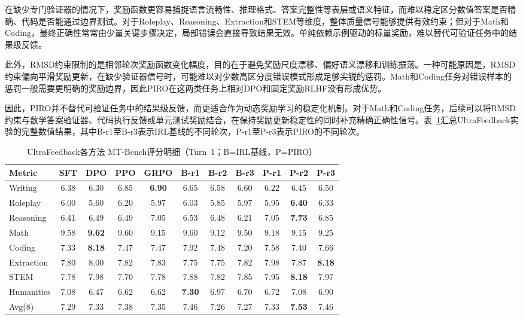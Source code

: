 在缺少专门验证器的情况下，奖励函数更容易捕捉语言流畅性、推理格式、答案完整性等表层或语义特征，而难以稳定区分数值答案是否精确、代码是否能通过边界测试。对于Roleplay、Reasoning、Extraction和STEM等维度，整体质量信号能够提供有效约束；但对于Math和Coding，最终正确性常常由少量关键步骤决定，局部错误会直接导致结果无效。单纯依赖示例驱动的标量奖励，难以替代可验证任务中的结果级反馈。

此外，RMSD约束限制的是相邻轮次奖励函数变化幅度，目的在于避免奖励尺度漂移、偏好语义漂移和训练振荡。一种可能原因是，RMSD约束偏向平滑奖励更新，在缺少验证器信号时，可能难以对少数高区分度错误模式形成足够尖锐的惩罚。Math和Coding任务对错误样本的惩罚一般需要更明确的奖励边界，因此PIRO在这两类任务上相对DPO和固定奖励RLHF没有形成优势。

因此，PIRO并不替代可验证任务中的结果级反馈，而更适合作为动态奖励学习的稳定化机制。对于Math和Coding任务，后续可以将RMSD约束与数学答案验证器、代码执行反馈或单元测试奖励结合，在保持奖励更新稳定性的同时补充精确正确性信号。表~\ref{tab:uf_detail}汇总UltraFeedback实验的完整数值结果，其中B-r1至B-r3表示IRL基线的不同轮次，P-r1至P-r3表示PIRO的不同轮次。

\begin{table}[H]
    \centering
    \caption{UltraFeedback各方法 MT-Bench评分明细（Turn~1；B=IRL基线，P=PIRO）}
    \label{tab:uf_detail}
    \scriptsize
    \renewcommand{\arraystretch}{1.12}
    \setlength{\tabcolsep}{4pt}
    \begin{tabular}{lcccccccccc}
        \toprule
        \textbf{Metric} & \textbf{SFT} & \textbf{DPO} & \textbf{PPO} & \textbf{GRPO} & \textbf{B-r1} & \textbf{B-r2} & \textbf{B-r3} & \textbf{P-r1} & \textbf{P-r2} & \textbf{P-r3} \\
        \midrule
        Writing    & 6.38 & 6.30 & 6.85 & \textbf{6.90} & 6.65 & 6.58 & 6.60 & 6.22 & 6.45 & 6.50 \\
        Roleplay   & 6.00 & 5.60 & 6.20 & 5.97 & 6.03 & 5.85 & 5.97 & 5.95 & \textbf{6.40} & 6.33 \\
        Reasoning  & 6.41 & 6.49 & 6.49 & 7.05 & 6.53 & 6.48 & 6.21 & 7.05 & \textbf{7.73} & 6.85 \\
        Math       & 9.58 & \textbf{9.62} & 9.60 & 9.15 & 9.60 & 9.12 & 9.50 & 9.18 & 9.15 & 9.25 \\
        Coding     & 7.33 & \textbf{8.18} & 7.47 & 7.47 & 7.92 & 7.48 & 7.20 & 7.58 & 7.40 & 7.66 \\
        Extraction & 7.80 & 8.00 & 7.82 & 7.83 & 7.75 & 7.75 & 7.82 & 7.98 & 7.87 & \textbf{8.18} \\
        STEM       & 7.78 & 7.98 & 7.70 & 7.78 & 7.88 & 7.82 & 7.85 & 7.95 & \textbf{8.18} & 7.97 \\
        Humanities & 7.08 & 6.47 & 6.62 & 6.62 & \textbf{7.30} & 6.97 & 6.70 & 6.72 & 7.08 & 6.90 \\
        \midrule
        Avg(8)     & 7.29 & 7.33 & 7.38 & 7.35 & 7.46 & 7.26 & 7.27 & 7.33 & \textbf{7.53} & 7.46 \\
        \bottomrule
    \end{tabular}
\end{table}

